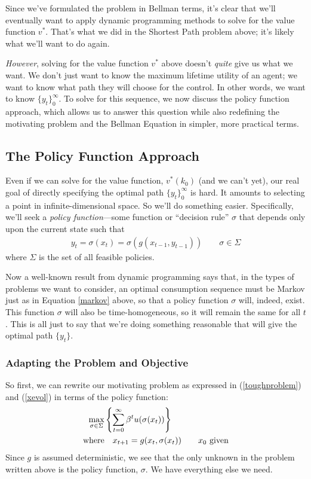 \documentclass[a4paper,12pt]{scrartcl}
\begin{document}
Since we've formulated the problem in Bellman terms, it's
clear that we'll eventually want to apply dynamic
programming methods to solve for the value function $v^*$.
That's what we did in the Shortest Path problem above; it's
likely what we'll want to do again.  


\emph{However}, solving for the value function $v^*$ above
doesn't \emph{quite} give us what we want. We don't just
want to know the maximum lifetime utility of an agent; we
want to know what path they will choose for the control.
In other words, we want to know $\{y_t\}_0^\infty$. To
solve for this sequence, we now discuss the policy function
approach, which allows us to answer this question while
also redefining the motivating problem and the Bellman
Equation in simpler, more practical terms. 


\subsection{The Policy Function Approach}

Even if we can solve for the value function, $v^*(k_0)$
(and we can't yet), our real goal of directly specifying
the optimal path $\{y_t\}_0^\infty$ is hard. It amounts to
selecting a point in infinite-dimensional space.  So we'll
do something easier. Specifically, we'll seek a
\emph{policy function}---some function or ``decision rule''
$\sigma$ that depends only upon the current state such that 
\begin{align}
  \label{markov}
  y_t = \sigma(x_t) = \sigma(g(x_{t-1}, y_{t-1}))
  \qquad \sigma \in \Sigma
\end{align}
where $\Sigma$ is the set of all feasible policies. 

Now a well-known result from dynamic programming says that,
in the types of problems we want to consider, an optimal
consumption sequence must be Markov just as in Equation
\ref{markov} above, so that a policy function $\sigma$
will, indeed, exist.  This function $\sigma$ will also be
time-homogeneous, so it will remain the same for all $t$.
This is all just to say that we're doing something
reasonable that will give the optimal path $\{y_t\}$.

\subsubsection{Adapting the Problem and Objective}

So first, we can rewrite our motivating problem as
expressed in (\ref{toughproblem}) and (\ref{xevol}) in
terms of the policy function:
\begin{align}
  \label{policyapproach}
  \max_{\sigma \in \Sigma} 
  &\left\{ \sum^\infty_{t=0} \beta^t u(\sigma(x_t)) \right\}\\
  \text{where} &\quad
  x_{t+1} = g(x_t, \sigma(x_t)) 
  \qquad \text{$x_0$ given}
  \notag
\end{align}
Since $g$ is assumed deterministic, we see that the only
unknown in the problem written above is the policy
function, $\sigma$. We have everything else we need.
\end{document}
